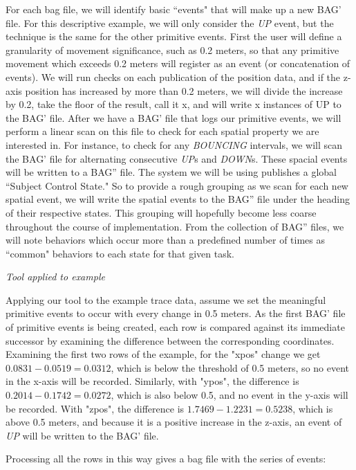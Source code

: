 For each bag file, we will identify basic ``events" that will make up a new BAG' file.  
For this descriptive example, we will only consider the \emph{UP} event, but the technique is the same for the other primitive events.  
First the user will define a granularity of movement significance, such as 0.2 meters, so that any primitive movement which exceeds 0.2 meters will register as an event (or concatenation of events).
We will run checks on each publication of the position data, and if the z-axis position has increased by more than 0.2 meters, we will divide the increase by 0.2, take the floor of the result, call it x, and will write x instances of UP to the BAG' file.  
After we have a BAG' file that logs our primitive events, we will perform a linear scan on this file to check for each spatial property we are interested in.  
For instance, to check for any \emph{BOUNCING} intervals, we will scan the BAG' file for alternating consecutive \emph{UP}s and \emph{DOWN}s. 
These spacial events will be written to a BAG'' file.
The system we will be using publishes a global ``Subject Control State."
So to provide a rough grouping as we scan for each new spatial event, we will write the spatial events to the BAG'' file under the heading of their respective states.
This grouping will hopefully become less coarse throughout the course of implementation.
From the collection of BAG'' files, we will note behaviors which occur more than a predefined number of times as ``common" behaviors to each state for that given task.

\emph{Tool applied to example}

Applying our tool to the example trace data, assume we set the meaningful primitive events to occur with every change in 0.5 meters. 
As the first BAG' file of primitive events is being created, each row is compared against its immediate successor by examining the difference between the corresponding coordinates.
Examining the first two rows of the example, for the "xpos" change we get $0.0831-0.0519=0.0312$, which is below the threshold of 0.5 meters, so no event in the x-axis will be recorded.  
Similarly, with "ypos", the difference is $0.2014-0.1742=0.0272$, which is also below 0.5, and no event in the y-axis will be recorded.
With "zpos", the difference is $1.7469-1.2231=0.5238$, which is above 0.5 meters, and because it is a positive increase in the z-axis, an event of \emph{UP} will be written to the BAG' file.

Processing all the rows in this way gives a bag file with the series of events: 

